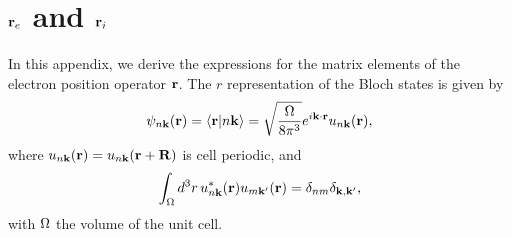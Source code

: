 \section{$\mathbf{r}_e$ and $\mathbf{r}_i$}
\label{reri}
In this appendix, we derive the expressions for the matrix elements of
the electron position operator $\mathbf{r}$. 
The $r$ representation of the
Bloch states is given by
\begin{equation}\label{bloch}
\psi_{n\mathbf{k}}(\mathbf{r})=\langle {\mathbf{r}} | {n\mathbf{k}} \rangle=\sqrt{\frac{\Omega}{8\pi^3}}
e^{i\mathbf{k} \cdot \mathbf{r}}u_{n\mathbf{k}}(\mathbf{r})
,
\end{equation}
where
$u_{n\mathbf{k}}(\mathbf{r})=u_{n\mathbf{k}}(\mathbf{r}+\mathbf{R})$ is cell periodic, and
\begin{equation}\label{normal}
\int_{\Omega}d^{3}r\, u_{n\mathbf{k}}^{*}(\mathbf{r})u_{m\mathbf{k}'}(\mathbf{r})=\delta_{nm}\delta_{\mathbf{\mathbf{k},\mathbf{k}'}}
,
\end{equation}
with $\Omega$ the volume of the unit cell.

